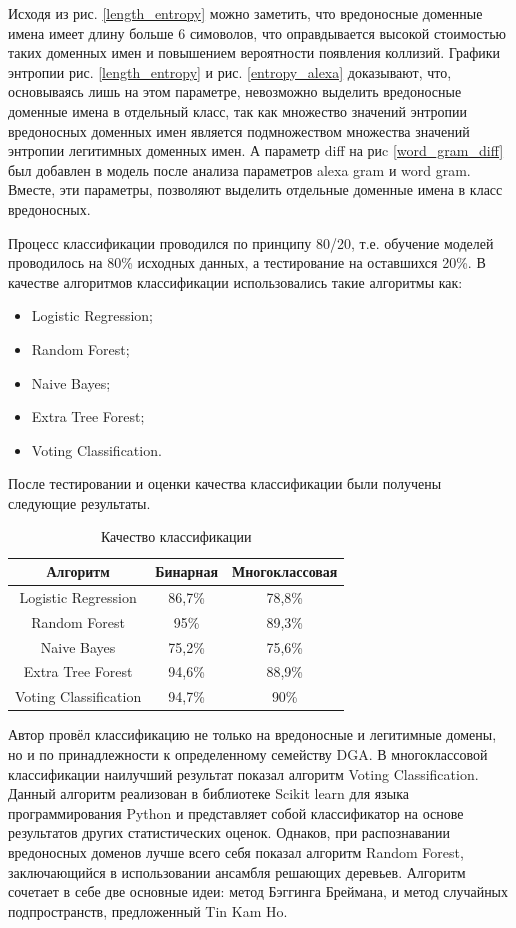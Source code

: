     Исходя из рис. \ref{length_entropy} можно заметить, что вредоносные доменные имена имеет длину больше 6 симоволов, что оправдывается высокой стоимостью таких доменных имен и повышением вероятности появления коллизий. Графики энтропии рис. \ref{length_entropy} и рис. \ref{entropy_alexa} доказывают, что, основываясь лишь на этом параметре, невозможно выделить вредоносные доменные имена в отдельный класс, так как множество значений энтропии вредоносных доменных имен является подмножеством множества значений энтропии легитимных доменных имен. А параметр diff на риc \ref{word_gram_diff} был добавлен в модель после анализа параметров alexa gram и word gram. Вместе, эти параметры, позволяют выделить отдельные доменные имена в класс вредоносных.

    Процесс классификации проводился по принципу 80/20, т.е. обучение моделей проводилось на 80\% исходных данных, а тестирование на оставшихся 20\%. В качестве алгоритмов классификации использовались такие алгоритмы как:
    \begin{itemize}
    \item Logistic Regression;
    \item Random Forest;
    \item Naive Bayes;
    \item Extra Tree Forest;
    \item Voting Classification.
    \end{itemize}

    После тестировании и оценки качества классификации были получены следующие результаты.
    \begin{table}[ht]
    \centering
    \caption{Качество классификации}\label{}
    \begin{tabular}{@{}ccc@{}}
    \toprule
    Алгоритм              & Бинарная & Многоклассовая \\ \midrule
    Logistic Regression   & 86,7\%   & 78,8\%         \\
    Random Forest         & 95\%     & 89,3\%         \\
    Naive Bayes           & 75,2\%   & 75,6\%         \\
    Extra Tree Forest     & 94,6\%   & 88,9\%         \\
    Voting Classification & 94,7\%   & 90\%           \\ \bottomrule
    \end{tabular}
    \end{table}

    Автор провёл классификацию не только на вредоносные и легитимные домены, но и по принадлежности к определенному семейству DGA. В многоклассовой классификации наилучший результат показал алгоритм Voting Classification. Данный алгоритм реализован в библиотеке Scikit learn для языка программирования Python и представляет собой классификатор на основе результатов других статистических оценок. Однаков, при распознавании вредоносных доменов лучше всего себя показал алгоритм Random Forest, заключающийся в использовании ансамбля решающих деревьев. Алгоритм сочетает в себе две основные идеи: метод Бэггинга Бреймана, и метод случайных подпространств, предложенный Tin Kam Ho.

